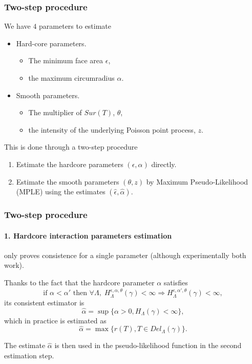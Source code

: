 \documentclass[c, 10pt]{beamer}
\begin{document}
\begin{frame}\frametitle{Two-step procedure}
\begin{small}
We have $4$ parameters to estimate
\begin{itemize}
\item Hard-core parameters.
    \begin{itemize}
    \item The minimum face area $\epsilon$,
    \item the maximum circumradius $\alpha$.
    \end{itemize}
\item Smooth parameters.
    \begin{itemize}
    \item The multiplier of $Sur(T)$, $\theta$,
    \item the intensity of the underlying Poisson point process, $z$.
    \end{itemize}
\end{itemize}
\vspace{5mm}
This is done through a \alert{two-step procedure}
\begin{enumerate}
    \item Estimate the hardcore parameters $(\epsilon, \alpha)$ directly.
    \item Estimate the smooth parameters $(\theta,z)$ by \alert{Maximum Pseudo-Likelihood} (MPLE) using the estimates $(\hat\epsilon,\hat\alpha)$.
\end{enumerate}
\end{small}


\end{frame}

\begin{frame}\frametitle{Two-step procedure}\framesubtitle{1. Hardcore interaction parameters estimation}
\begin{small}
[Ref] only proves consistence for a single parameter (although experimentally both work).\newline

Thanks to the fact that the hardcore parameter $\alpha$ satisfies
$$ \text{if } \alpha < \alpha' \text{ then  } \forall \Lambda, \; H^{\epsilon,\alpha,\theta}_\Lambda(\gamma) < \infty \Rightarrow  H^{\epsilon,\alpha',\theta}_\Lambda(\gamma)<\infty,$$ 
its consistent estimator is
$$\hat\alpha = \sup\{\alpha > 0, H_\Lambda(\gamma) < \infty \},$$
which in practice is estimated as
$$\hat\alpha = \max\{r(T), T\in Del_\Lambda(\gamma)\}.$$

The estimate $\hat\alpha$ is then used in the pseudo-likelihood function in the second estimation step.

\end{small}
\end{frame}
\end{document}
